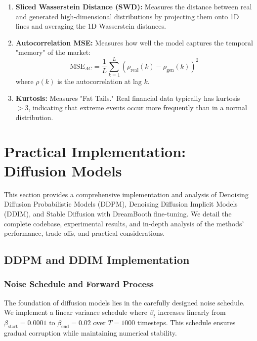 \documentclass[a4paper,12pt]{article}
\begin{document}
\begin{enumerate}
    \item \textbf{Sliced Wasserstein Distance (SWD):} Measures the distance between real and generated high-dimensional distributions by projecting them onto 1D lines and averaging the 1D Wasserstein distances.
    \item \textbf{Autocorrelation MSE:} Measures how well the model captures the temporal "memory" of the market:
    \begin{equation}
        \text{MSE}_{AC} = \frac{1}{L} \sum_{k=1}^L (\rho_{\text{real}}(k) - \rho_{\text{gen}}(k))^2
    \end{equation}
    where $\rho(k)$ is the autocorrelation at lag $k$.
    \item \textbf{Kurtosis:} Measures "Fat Tails." Real financial data typically has kurtosis $> 3$, indicating that extreme events occur more frequently than in a normal distribution.
\end{enumerate}

\newpage
\section{Practical Implementation: Diffusion Models}

This section provides a comprehensive implementation and analysis of Denoising Diffusion Probabilistic Models (DDPM), Denoising Diffusion Implicit Models (DDIM), and Stable Diffusion with DreamBooth fine-tuning. We detail the complete codebase, experimental results, and in-depth analysis of the methods' performance, trade-offs, and practical considerations.

\subsection{DDPM and DDIM Implementation}

\subsubsection{Noise Schedule and Forward Process}

The foundation of diffusion models lies in the carefully designed noise schedule. We implement a linear variance schedule where $\beta_t$ increases linearly from $\beta_{\text{start}} = 0.0001$ to $\beta_{\text{end}} = 0.02$ over $T=1000$ timesteps. This schedule ensures gradual corruption while maintaining numerical stability.
\end{document}
